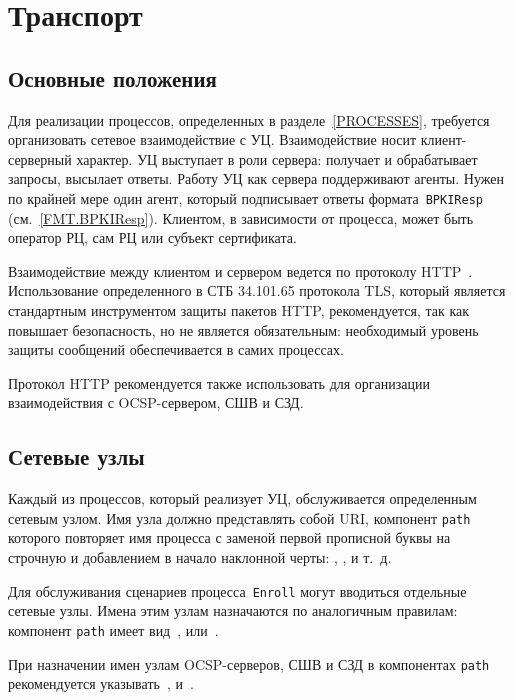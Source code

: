 \chapter{Транспорт}\label{TRANSPORT}

\section{Основные положения}\label{TRANSPORT.Common}

Для реализации процессов, определенных в разделе~\ref{PROCESSES}, 
требуется организовать сетевое взаимодействие с УЦ. Взаимодействие носит 
клиент-серверный характер. 
%
УЦ выступает в роли сервера:
получает и обрабатывает запросы, высылает ответы.
Работу УЦ как сервера поддерживают агенты.
Нужен по крайней мере один агент, который подписывает ответы 
формата~\texttt{BPKIResp} (см.~\ref{FMT.BPKIResp}).
%
Клиентом, в зависимости от процесса, может быть оператор РЦ, сам РЦ или 
субъект сертификата.

Взаимодействие между клиентом и сервером ведется по протоколу HTTP~\cite{HTTP}.
Использование определенного в СТБ 34.101.65 протокола TLS, который 
является стандартным инструментом защиты пакетов HTTP, рекомендуется, 
так как повышает безопасность, но не является обязательным:
необходимый уровень защиты сообщений обеспечивается в самих процессах. 

Протокол HTTP рекомендуется также использовать для организации 
взаимодействия с OCSP-сервером, СШВ и СЗД. 

\section{Сетевые узлы}\label{TRANSPORT.Endpoints}

Каждый из процессов, который реализует УЦ, обслуживается определенным 
сетевым узлом. Имя узла должно представлять собой URI, компонент 
\texttt{path} которого повторяет имя процесса с заменой первой прописной 
буквы на строчную и добавлением в начало наклонной черты: , 
,  и т.~д.

Для обслуживания сценариев процесса~\texttt{Enroll} могут вводиться 
отдельные сетевые узлы. Имена этим узлам назначаются по аналогичным 
правилам: компонент \texttt{path} имеет вид~, 
 или~.

При назначении имен узлам OCSP-серверов, СШВ и СЗД в компонентах  
\texttt{path} рекомендуется указывать~, 
 и~.


